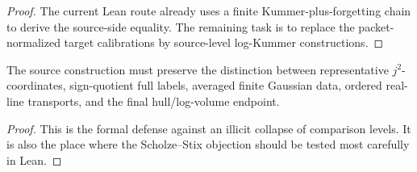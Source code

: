 \begin{proof}
  The current Lean route already uses a finite Kummer-plus-forgetting chain to
  derive the source-side equality.  The remaining task is to replace the
  packet-normalized target calibrations by source-level log-Kummer
  constructions.
\end{proof}

\begin{theorem}
  \label{thm:preserve-comparison-levels}
  \notready
  The source construction must preserve the distinction between
  representative \(j^2\)-coordinates, sign-quotient full labels, averaged
  finite Gaussian data, ordered real-line transports, and the final
  hull/log-volume endpoint.
\end{theorem}

\begin{proof}
  This is the formal defense against an illicit collapse of comparison levels.
  It is also the place where the Scholze--Stix objection should be tested most
  carefully in Lean.
\end{proof}
